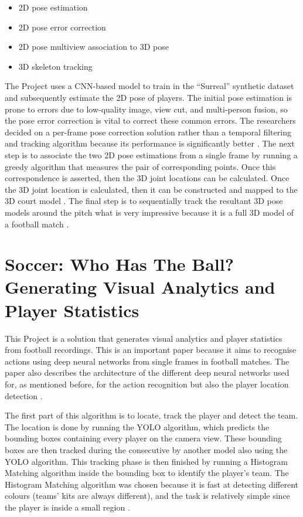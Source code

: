 \documentclass[
    11pt,
    oneside
]{report}
\begin{document}
\begin{itemize}
    \item 2D pose estimation
    \item 2D pose error correction
    \item 2D pose multiview association to 3D pose
    \item 3D skeleton tracking
\end{itemize}

The Project uses a CNN-based model to train in the ``Surreal'' synthetic dataset \cite{surreal} and subsequently estimate the 2D pose of players.
The initial pose estimation is prone to errors due to low-quality image, view cut, and multi-person fusion, so the pose error correction is vital to correct these common errors. The researchers decided on a per-frame pose correction solution rather than a temporal filtering and tracking algorithm because its performance is significantly better \cite{cvpr_2019}.
The next step is to associate the two 2D pose estimations from a single frame by running a greedy algorithm that measures the pair of corresponding points. Once this correspondence is asserted, then the 3D joint locations can be calculated. Once the 3D joint location is calculated, then it can be constructed and mapped to the 3D court model \cite{cvpr_2019}.
The final step is to sequentially track the resultant 3D pose models around the pitch what is very impressive because it is a full 3D model of a football match \cite{cvpr_2019}.






\section{Soccer: Who Has The Ball? Generating Visual Analytics and Player Statistics}


This Project is a solution that generates visual analytics and player statistics from football recordings. This is an important paper because it aims to recognise actions using deep neural networks from single frames in football matches. The paper also describes the architecture of the different deep neural networks used for, as mentioned before, for the action recognition but also the player location detection \cite{cvpr_2018}.




The first part of this algorithm is to locate, track the player and detect the team. The location is done by running the YOLO \cite{yolo} algorithm, which predicts the bounding boxes containing every player on the camera view. These bounding boxes are then tracked during the consecutive by another model also using the YOLO \cite{yolo} algorithm. This tracking phase is then finished by running a Histogram Matching algorithm inside the bounding box to identify the player's team. The Histogram Matching algorithm was chosen because it is fast at detecting different colours (teams' kits are always different), and the task is relatively simple since the player is inside a small region \cite{cvpr_2018}.
\end{document}

